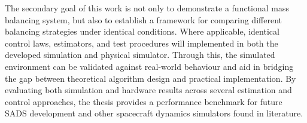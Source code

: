 The secondary goal of this work is not only to demonstrate a functional mass balancing system, but also to establish a framework for comparing different balancing strategies under identical conditions. Where applicable, identical control laws, estimators, and test procedures will implemented in both the developed simulation and physical simulator. Through this, the simulated environment can be validated against real-world behaviour and aid in bridging the gap between theoretical algorithm design and practical implementation. By evaluating both simulation and hardware results across several estimation and control approaches, the thesis provides a performance benchmark for future SADS development and other spacecraft dynamics simulators found in literature.